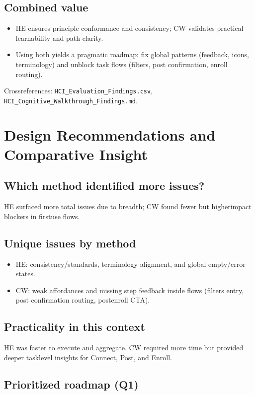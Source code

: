 \documentclass[11pt,a4paper]{article}
\begin{document}
\subsection{Combined value}
\begin{itemize}[leftmargin=*]
  \item HE ensures principle conformance and consistency; CW validates practical learnability and path clarity.
  \item Using both yields a pragmatic roadmap: fix global patterns (feedback, icons, terminology) and unblock task flows (filters, post confirmation, enroll routing).
\end{itemize}

Cross\-references: \texttt{HCI\_Evaluation\_Findings.csv}, \texttt{HCI\_Cognitive\_Walkthrough\_Findings.md}.

\section{Design Recommendations and Comparative Insight}

\subsection{Which method identified more issues?}
HE surfaced more total issues due to breadth; CW found fewer but higher\-impact blockers in first\-use flows.

\subsection{Unique issues by method}
\begin{itemize}[leftmargin=*]
  \item HE: consistency/standards, terminology alignment, and global empty/error states.
  \item CW: weak affordances and missing step feedback inside flows (filters entry, post confirmation routing, post\-enroll CTA).
\end{itemize}

\subsection{Practicality in this context}
HE was faster to execute and aggregate. CW required more time but provided deeper task\-level insights for Connect, Post, and Enroll.

\subsection{Prioritized roadmap (Q1)}
\end{document}
